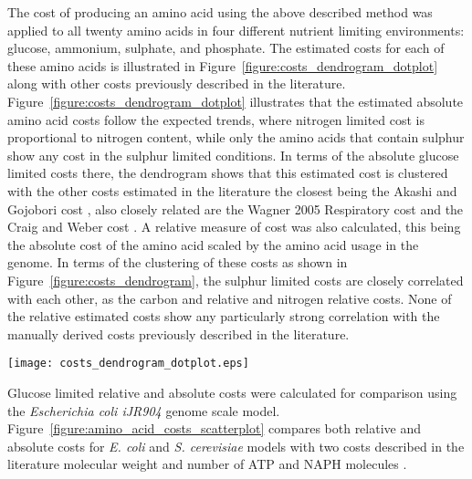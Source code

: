 The cost of producing an amino acid using the above described method was applied to all twenty amino acids in four different nutrient limiting environments: glucose, ammonium, sulphate, and phosphate. The estimated costs for each of these amino acids is illustrated in Figure~\vref{figure:costs_dendrogram_dotplot} along with other costs previously described in the literature. Figure~\ref{figure:costs_dendrogram_dotplot} illustrates that the estimated absolute amino acid costs follow the expected trends, where nitrogen limited cost is proportional to nitrogen content, while only the amino acids that contain sulphur show any cost in the sulphur limited conditions. In terms of the absolute glucose limited costs there, the dendrogram shows that this estimated cost is clustered with the other costs estimated in the literature the closest being the Akashi and Gojobori cost \cite{akashi2002}, also closely related are the Wagner 2005 Respiratory cost \cite{wagner} and the Craig and Weber cost \cite{craig}. A relative measure of cost was also calculated, this being the absolute cost of the amino acid scaled by the amino acid usage in the genome. In terms of the clustering of these costs as shown in Figure~\ref{figure:costs_dendrogram}, the sulphur limited costs are closely correlated with each other, as the carbon and relative and nitrogen relative costs. None of the relative estimated costs show any particularly strong correlation with the manually derived costs previously described in the literature.

\begin{sidewaysfigure}
\centering
\texttt{[image: costs\_dendrogram\_dotplot.eps]}
\caption[Comparison of amino acid cost estimates]{Amino acid cost estimates are shown as bar charts on the left hand side. Each bar chart axis shows the minimum and maximum value of each cost type, rounded to three significant figures. The correlations between costs are compared in a dendrogram on the right hand side computed by complete agglomerative clustering using Spearman's Rank correlation distance between data sets. The illustrated data is shown in Table~\ref{} in Appendix~\vref{appendix:amino_acid_costs}}
\label{figure:costs_dendrogram_dotplot}
\end{sidewaysfigure}

Glucose limited relative and absolute costs were calculated for comparison using the \emph{Escherichia coli iJR904} genome scale model. Figure~\vref{figure:amino_acid_costs_scatterplot} compares both relative and absolute costs for \emph{E. coli} and \emph{S. cerevisiae} models with two costs described in the literature molecular weight \cite{seligmann} and number of ATP and NAPH molecules \cite{akashi2002}.

